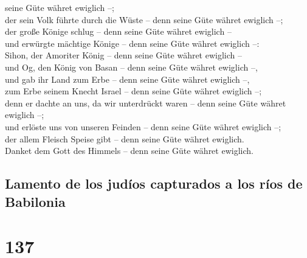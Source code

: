 seine Güte währet ewiglich --;\\
 der sein Volk führte durch die Wüste -- denn seine Güte
währet ewiglich --;\\
 der große Könige schlug -- denn seine Güte währet
ewiglich --\\
 und erwürgte mächtige Könige -- denn seine Güte währet
ewiglich --:\\
 Sihon, der Amoriter König -- denn seine Güte währet
ewiglich --\\
 und Og, den König von Basan -- denn seine Güte währet
ewiglich --,\\
 und gab ihr Land zum Erbe -- denn seine Güte währet
ewiglich --,\\
 zum Erbe seinem Knecht Israel -- denn seine Güte währet
ewiglich --;\\
 denn er dachte an uns, da wir unterdrückt waren -- denn
seine Güte währet ewiglich --;\\
 und erlöste uns von unseren Feinden -- denn seine Güte
währet ewiglich --;\\
 der allem Fleisch Speise gibt -- denn seine Güte währet
ewiglich.\\
 Danket dem Gott des Himmels -- denn seine Güte währet
ewiglich.

\hypertarget{lamento-de-los-juduxedos-capturados-a-los-ruxedos-de-babilonia}{%
\subsection{Lamento de los judíos capturados a los ríos de
Babilonia}\label{lamento-de-los-juduxedos-capturados-a-los-ruxedos-de-babilonia}}

\hypertarget{section-136}{%
\section{137}\label{section-136}}

